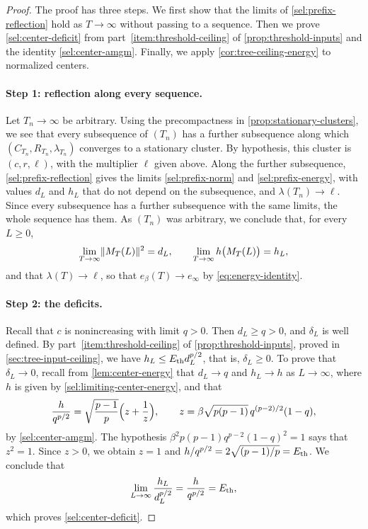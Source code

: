 \begin{proof}
The proof has three steps. We first show that the limits of \cref{sel:prefix-reflection} hold as $T\to\infty$ without passing to a sequence. Then we prove \eqref{sel:center-deficit} from part~\ref{item:threshold-ceiling} of \cref{prop:threshold-inputs} and the identity \eqref{sel:center-amgm}. Finally, we apply \cref{cor:tree-ceiling-energy} to normalized centers.

\paragraph{Step 1: reflection along every sequence.}
Let $T_n\to\infty$ be arbitrary. Using the precompactness in \cref{prop:stationary-clusters}, we see that every subsequence of $(T_n)$ has a further subsequence along which $(C_{T_n},R_{T_n},\lambda_{T_n})$ converges to a stationary cluster. By hypothesis, this cluster is $(c,r,\ell)$, with the multiplier $\ell$ given above. Along the further subsequence, \cref{sel:prefix-reflection} gives the limits \eqref{sel:prefix-norm} and \eqref{sel:prefix-energy}, with values $d_L$ and $h_L$ that do not depend on the subsequence, and $\lambda(T_n)\to\ell$. Since every subsequence has a further subsequence with the same limits, the whole sequence has them. As $(T_n)$ was arbitrary, we conclude that, for every $L\ge0$,
\begin{equation}\label{eq:tree-reflection-all-times}
 \lim_{T\to\infty}\lVert M_T(L)\rVert^2=d_L,\qquad \lim_{T\to\infty}h\bigl(M_T(L)\bigr)=h_L,
\end{equation}
and that $\lambda(T)\to\ell$, so that $e_\beta(T)\to e_\infty$ by \eqref{eq:energy-identity}.

\paragraph{Step 2: the deficits.}
Recall that $c$ is nonincreasing with limit $q>0$. Then $d_L\ge q>0$, and $\delta_L$ is well defined. By part~\ref{item:threshold-ceiling} of \cref{prop:threshold-inputs}, proved in \cref{sec:tree-input-ceiling}, we have $h_L\le E_{\mathrm{th}} d_L^{p/2}$, that is, $\delta_L\ge0$. To prove that $\delta_L\to0$, recall from \cref{lem:center-energy} that $d_L\to q$ and $h_L\to h$ as $L\to\infty$, where $h$ is given by \eqref{sel:limiting-center-energy}, and that
\[
 \frac h{q^{p/2}}=\sqrt{\frac{p-1}p}\Bigl(z+\frac1z\Bigr),\qquad z=\beta\sqrt{p(p-1)}\,q^{(p-2)/2}(1-q),
\]
by \eqref{sel:center-amgm}. The hypothesis $\beta^2p(p-1)q^{p-2}(1-q)^2=1$ says that $z^2=1$. Since $z>0$, we obtain $z=1$ and $h/q^{p/2}=2\sqrt{(p-1)/p}=E_{\mathrm{th}}$. We conclude that
\[
 \lim_{L\to\infty}\frac{h_L}{d_L^{p/2}}=\frac h{q^{p/2}}=E_{\mathrm{th}},
\]
which proves \eqref{sel:center-deficit}.


\end{proof}
